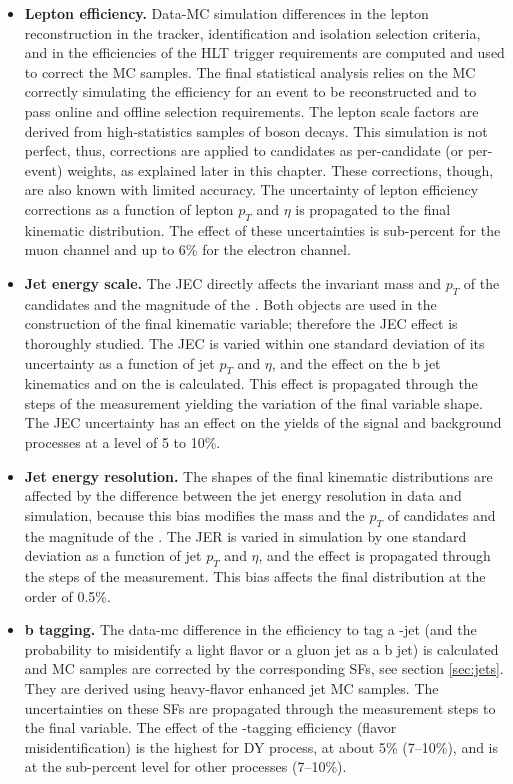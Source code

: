 \begin{itemize}

\item{\bf Lepton efficiency.} 
Data-MC simulation differences in the lepton reconstruction in the tracker, identification and isolation selection criteria, and in the efficiencies of the HLT trigger requirements are computed and used to correct the MC samples. The final statistical analysis relies on the MC correctly simulating the efficiency for an event to be reconstructed and to pass online and offline selection requirements. The lepton scale factors are derived from high-statistics samples of \PZ boson decays. This simulation is not perfect, thus, corrections are applied to candidates as per-candidate (or per-event) weights, as explained later in this chapter. These corrections, though, are also known with limited accuracy. The uncertainty of lepton efficiency corrections as a function of lepton $p_T$ and $\eta$ is propagated to the final kinematic distribution. The effect of these uncertainties is sub-percent for the muon channel and up to 6\% for the electron channel.

\item{\bf Jet energy scale.}
The JEC directly affects the invariant mass and $p_T$ of the \HBB candidates and the magnitude of the \PTslash. Both objects are used in the construction of the final kinematic variable; therefore the JEC effect is thoroughly studied. The JEC is varied within one standard deviation of its uncertainty as a function of jet $p_T$ and $\eta$, and the effect on the b jet kinematics and on the \PTslash is calculated. This effect is propagated through the steps of the measurement yielding the variation of the final variable shape. The JEC uncertainty has an effect on the yields of the signal and background processes at a level of 5 to 10\%.

\item{\bf Jet energy resolution.} 
The shapes of the final kinematic distributions are affected by the difference between the jet energy
resolution in data and simulation, because this bias modifies the mass and the $p_T$ of \HBB candidates and the magnitude of the \PTslash. The JER is varied in simulation by one standard deviation as a function of jet $p_T$ and $\eta$, and the effect is propagated through the steps of the measurement. This bias affects the final distribution at the order of 0.5\%.

\item{\bf b tagging.}
The data-mc difference in the efficiency to tag a \PQb-jet (and the probability to misidentify a light flavor or a gluon jet as a b jet) is calculated and MC samples are corrected by the corresponding SFs, see section \ref{sec:jets}. They are derived using heavy-flavor enhanced jet MC samples. The uncertainties on these SFs are propagated through the measurement steps to the final variable. The effect of the \PQb-tagging efficiency (flavor misidentification) is the highest for DY process, at about 5\% (7--10\%), and is at the sub-percent level for other processes (7--10\%). 


\end{itemize}
